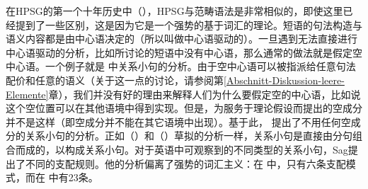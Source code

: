 在HPSG的第一个十年历史中（\citealp*{ps,ps2,NNP94a-ed-not-crossreferenced}），HPSG与范畴语法是非常相似的，即使这里已经提到了一些区别，这是因为它是一个强势的基于词汇的理论。短语的句法构造与语义内容都是由中心语决定的（所以叫做中心语驱动的）。一旦遇到无法直接进行中心语驱动的分析，比如所讨论的短语中没有中心语，那么通常的做法就是假定空中心语。一个例子就是 \citet[\S~5]{ps2}中关系小句的分析。由于空中心语可以被指派给任意句法配价和任意的语义（关于这一点的讨论，请参阅第\ref{Abschnitt-Diskussion-leere-Elemente}章），我们并没有好的理由来解释人们为什么要假定空的中心语，比如说这个空位置可以在其他语境中得到实现。但是，为服务于理论假设而提出的空成分并不是这样（即空成分并不能在其它语境中出现）。基于此， \citet{Sag97a}提出了不用任何空成分的关系小句的分析。正如（）和（）草拟的分析一样，关系小句是直接由分句组合而成的，以构成关系小句。对于英语中可观察到的不同类型的关系小句，Sag提出了不同的支配规则。他的分析偏离了强势的词汇主义：在 中，只有六条支配模式，而在 中有23条。

